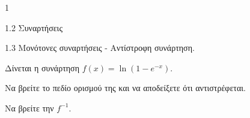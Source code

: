 \begin{ylh}{1}
    \item 1.2 Συναρτήσεις
    \item 1.3 Μονότονες συναρτήσεις - Αντίστροφη συνάρτηση.
\end{ylh}
Δίνεται η συνάρτηση $f(x)=\ln(1-e^{-x})$.
\begin{alist}
\item Να βρείτε το πεδίο ορισμού της και να αποδείξετε ότι αντιστρέφεται. 
\item Να βρείτε την $f^{-1}$. 
\end{alist}